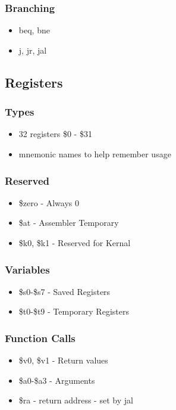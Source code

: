 \documentclass[usepdftitle=false,professionalfonts,compress ]{beamer}
\begin{document}
{
\begin{frame}\frametitle{Branching}

	\begin{itemize}
	\item beq, bne
			\item j, jr, jal
				\end{itemize}

\end{frame}}




\subsection{Registers}

{
\begin{frame}\frametitle{Types}

	\begin{itemize}
	\item 32 registers \$0 - \$31
			\item mnemonic names to help remember usage
				\end{itemize}

\end{frame}}




{
\begin{frame}\frametitle{Reserved}

	\begin{itemize}
	\item \$zero - Always 0
			\item \$at - Assembler Temporary
			\item \$k0, \$k1 - Reserved for Kernal
				\end{itemize}

\end{frame}}





{
\begin{frame}\frametitle{Variables}

	\begin{itemize}
	\item \$s0-\$s7 - Saved Registers
			\item \$t0-\$t9 - Temporary Registers
				\end{itemize}

\end{frame}}




{
\begin{frame}\frametitle{Function Calls}

	\begin{itemize}
	\item \$v0, \$v1 - Return values
			\item \$a0-\$a3 - Arguments
			\item \$ra - return address - set by jal
				\end{itemize}

\end{frame}}
\end{document}
